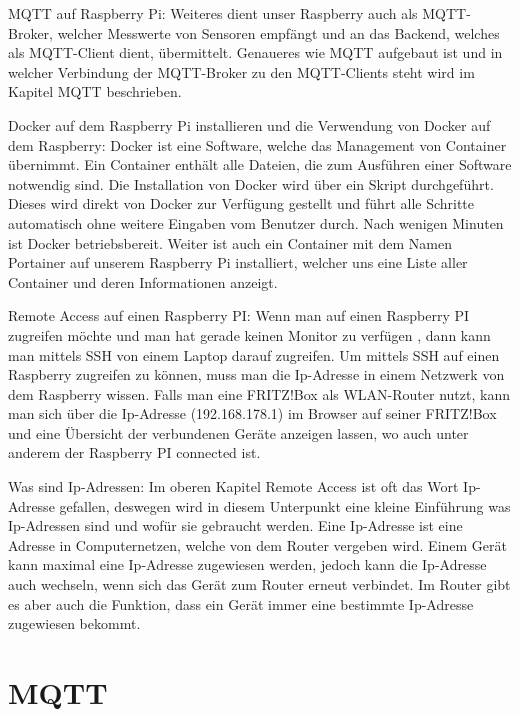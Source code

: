 MQTT auf Raspberry Pi:
Weiteres dient unser Raspberry auch als MQTT-Broker, welcher Messwerte von Sensoren empfängt und an das Backend, welches als MQTT-Client dient, übermittelt. 
Genaueres wie MQTT aufgebaut ist und in welcher Verbindung der MQTT-Broker zu den MQTT-Clients steht wird im Kapitel MQTT beschrieben.

Docker auf dem Raspberry Pi installieren und die Verwendung von Docker auf dem Raspberry:
Docker ist eine Software, welche das Management von Container übernimmt. Ein Container enthält alle Dateien, die zum Ausführen einer Software notwendig sind. 
Die Installation von Docker wird über ein Skript durchgeführt. 
Dieses wird direkt von Docker zur Verfügung gestellt und führt alle Schritte automatisch ohne weitere Eingaben vom Benutzer durch. 
Nach wenigen Minuten ist Docker betriebsbereit. 
Weiter ist auch ein Container mit dem Namen Portainer auf unserem Raspberry Pi installiert, welcher uns eine Liste aller Container und deren Informationen anzeigt.
 



Remote Access auf einen Raspberry PI:
Wenn man auf einen Raspberry PI zugreifen möchte und man hat gerade keinen Monitor zu verfügen , dann kann man mittels SSH von einem Laptop darauf zugreifen.
 Um mittels SSH auf einen Raspberry zugreifen zu können, muss man die Ip-Adresse in einem Netzwerk von dem Raspberry wissen. 
 Falls man eine FRITZ!Box als WLAN-Router nutzt, kann man sich über die Ip-Adresse (192.168.178.1) im Browser auf seiner FRITZ!Box und eine Übersicht der verbundenen Geräte anzeigen lassen, wo auch unter anderem der Raspberry PI connected ist. 

Was sind Ip-Adressen:
Im oberen Kapitel Remote Access ist oft das Wort Ip-Adresse gefallen, deswegen wird in diesem Unterpunkt eine kleine Einführung was Ip-Adressen sind und wofür sie gebraucht werden. 
Eine Ip-Adresse ist eine Adresse in Computernetzen, welche von dem Router vergeben wird.
 Einem Gerät kann maximal eine Ip-Adresse zugewiesen werden, jedoch kann die Ip-Adresse auch wechseln, wenn sich das Gerät zum Router erneut verbindet. 
 Im Router gibt es aber auch die Funktion, dass ein Gerät immer eine bestimmte Ip-Adresse zugewiesen bekommt. 






\section{MQTT}


